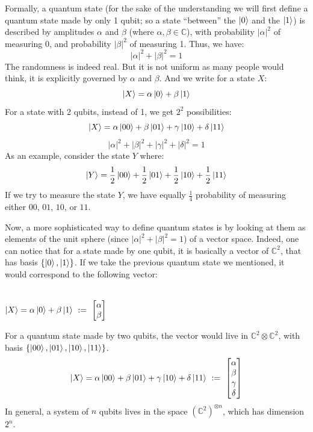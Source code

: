Formally, a quantum state (for the sake of the understanding we will first
define a quantum state made by only 1 qubit; so a state ``between'' the
$\ket{0}$ and the $\ket{1}$) is described by amplitudes $\alpha$ and $\beta$
(where $\alpha, \beta \in \mathbb{C}$), with probability $|\alpha|^2$ of
measuring 0, and probability $|\beta|^2$ of measuring 1. Thus, we have:
$$
|\alpha|^2 + |\beta|^2 = 1
$$
The randomness is indeed real. But it is not uniform as many people would
think, it is explicitly governed by $\alpha$ and $\beta$.
And we write for a state $X$:
$$
\ket{X} = \alpha \ket{0} + \beta \ket{1}
$$
For a state with 2 qubits, instead of 1, we get $2^2$ possibilities:
$$
\ket{X} = \alpha \ket{00} + \beta \ket{01} + \gamma \ket{10} + \delta \ket{11}
$$
$$
|\alpha|^2 + |\beta|^2 + |\gamma|^2 + |\delta|^2 = 1
$$
As an example, consider the state $Y$ where:
$$
\ket{Y} = \frac{1}{2} \ket{00} + \frac{1}{2} \ket{01} + \frac{1}{2} \ket{10}
+ \frac{1}{2} \ket{11}
$$
If we try to measure the state $Y$, we have equally $\frac{1}{4}$ probability
of measuring either $00$, $01$, $10$, or $11$.

Now, a more sophisticated way to define quantum states is by looking at them
as elements of the unit sphere (since $|\alpha|^2 + |\beta|^2 = 1$) of a
vector space.
Indeed, one can notice that for a state made by one qubit, it is basically a
vector of $\mathbb{C}^2$, that has basis $\{\ket{0}, \ket{1}\}$.
If we take the previous quantum state we mentioned, it would correspond to the
following vector:

\begin{center}
\\
$\ket{X} = \alpha \ket{0} + \beta \ket{1} \  := \
\begin{bmatrix} \alpha \\ \beta \end{bmatrix}$
\end{center}

For a quantum state made by two qubits, the vector would live in
$\mathbb{C}^2 \otimes \mathbb{C}^2$, with basis
$\{\ket{00}, \ket{01}, \ket{10}, \ket{11}\}$.
$$
\ket{X} = \alpha \ket{00} + \beta \ket{01} + \gamma \ket{10} + \delta \ket{11}
\ := \ \begin{bmatrix} \alpha \\ \beta \\ \gamma \\ \delta \end{bmatrix}
$$
In general, a system of $n$ qubits lives in the space
$(\mathbb{C}^2)^{\otimes n}$, which has dimension $2^n$.

